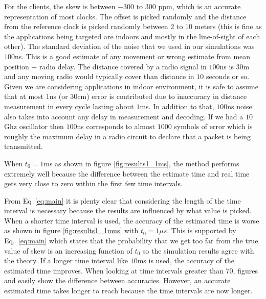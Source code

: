 \documentclass[10pt, journal, letter, onecolumn]{IEEEtran}
\begin{document}
For the clients, the skew is between $-300$ to $300$ ppm, which is an accurate representation of most clocks. The offset is picked randomly and the distance from the reference clock is picked randomly between $2$ to $10$ meters (this is fine as the applications being targeted are indoors and mostly in the line-of-sight of each other).
The standard deviation of the noise that we used in our simulations was $100$ns. This is a good estimate of any movement or wrong estimate from mean position + radio delay. The distance covered by a radio signal in $100$ns is $30$m and any moving radio would typically cover than distance in $10$ seconds or so. Given we are considering applications in indoor environment, it is safe to assume that at most $1$ns (or $30$cm) error is contributed due to inaccuracy in distance measurement in every cycle lasting about $1$ms. In addition to that, $100$ns noise also takes into account any delay in measurement and decoding. If we had a $10$Ghz oscillator then $100$ns corresponds to almost $1000$ symbols of error which is roughly the maximum delay in a radio circuit to declare that a packet is being transmitted.

When $t_0 = 1$ms as shown in figure \ref{fig:results1_1ms}, the method performs extremely well because the difference between the estimate time and real time gets very close to zero within the first few time intervals.

From Eq~\eqref{eq:main} it is plenty clear that considering the length of the time interval is necessary because the results are influenced by what value is picked. When a shorter time interval is used, the accuracy of the estimated time is worse as shown in figure \ref{fig:results1_1mus} with $t_0 = 1 \mu s$. This is supported by Eq.~\eqref{eq:main} which states that the probability that we get too far from the true value of skew is an increasing function of $t_0$ so the simulation results agree with the theory.
If a longer time interval like $10$ms is used, the accuracy of the estimated time improves. When looking at time intervals greater than 70, figures \label{fig:results2_1ms} and \label{fig:results2_10ms} easily show the difference between accuracies. However, an accurate estimated time takes longer to reach because the time intervals are now longer.
\end{document}

